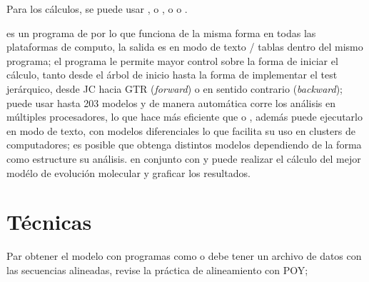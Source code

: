 Para los c\'alculos, se puede usar , o , o  o . 
 
 es un programa de  por lo que funciona de la misma forma en todas las plataformas de computo, la  salida es en modo de texto / tablas dentro del mismo programa; el programa le permite mayor control sobre la forma de iniciar el c\'alculo, tanto desde el \'arbol de inicio hasta la forma de implementar el test jer\'arquico, desde JC hacia GTR (\textit{forward}) o en sentido contrario  (\textit{backward}); 
puede usar hasta 203 modelos y de manera  autom\'atica corre los an\'alisis en m\'ultiples procesadores, lo que hace m\'as eficiente que  o , adem\'as puede ejecutarlo en modo de texto, con modelos diferenciales lo que facilita su uso en clusters de computadores; es posible que obtenga distintos modelos dependiendo de la forma como estructure su an\'alisis.  en conjunto con  y  puede realizar el c\'alculo del mejor mod\'elo de evoluci\'on molecular y graficar los resultados.


\section*{T\'ecnicas}

%
\noindent

Par obtener el modelo con programas como  o  debe tener un archivo de datos con las secuencias alineadas, revise la pr\'actica de alineamiento con POY; %

